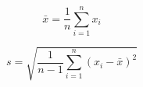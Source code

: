\documentclass[preview,10pt]{standalone}
\begin{document}
\[
\bar{x} = \frac{1}{n} \sum_{i=1}^{n} x_i
\]

\[
s = \sqrt{\frac{1}{n-1} \sum_{i=1}^{n} (x_i - \bar{x})^2}
\]
\end{document}
